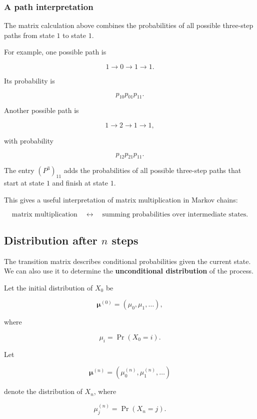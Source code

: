 \documentclass[
  letterpaper,
  DIV=11,
  numbers=noendperiod]{scrartcl}
\theoremstyle{definition}
\theoremstyle{remark}
\begin{document}
\subsubsection{A path interpretation}\label{a-path-interpretation}

The matrix calculation above combines the probabilities of all possible
three-step paths from state \(1\) to state \(1\).

For example, one possible path is

\[
1\longrightarrow 0\longrightarrow 1\longrightarrow 1.
\]

Its probability is

\[
p_{10}p_{01}p_{11}.
\]

Another possible path is

\[
1\longrightarrow 2\longrightarrow 1\longrightarrow 1,
\]

with probability

\[
p_{12}p_{21}p_{11}.
\]

The entry \((P^3)_{11}\) adds the probabilities of all possible
three-step paths that start at state \(1\) and finish at state \(1\).

This gives a useful interpretation of matrix multiplication in Markov
chains:

\[
\boxed{
\text{matrix multiplication}
\quad\longleftrightarrow\quad
\text{summing probabilities over intermediate states}.
}
\]

\subsection{\texorpdfstring{Distribution after \(n\)
steps}{Distribution after n steps}}\label{distribution-after-n-steps}

The transition matrix describes conditional probabilities given the
current state. We can also use it to determine the \textbf{unconditional
distribution} of the process.

Let the initial distribution of \(X_0\) be

\[
\boldsymbol{\mu}^{(0)}
=
(\mu_0,\mu_1,\ldots),
\]

where

\[
\mu_i=\Pr(X_0=i).
\]

Let

\[
\boldsymbol{\mu}^{(n)}
=
(\mu_0^{(n)},\mu_1^{(n)},\ldots)
\]

denote the distribution of \(X_n\), where

\[
\mu_j^{(n)}=\Pr(X_n=j).
\]
\end{document}
